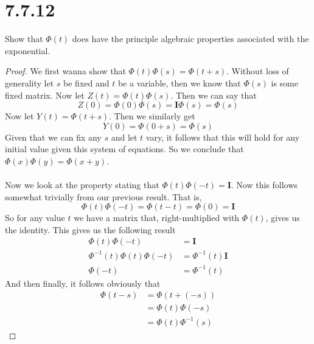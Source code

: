 \documentclass{article}
\theoremstyle{definition}
\begin{document}
\section*{7.7.12}
    \begin{mdframed}[]
        Show that $\Phi(t)$ does have the principle algebraic properties associated with the exponential.
    \end{mdframed}
    \begin{proof}
        We first wanna show that $\Phi(t)\Phi(s) = \Phi(t + s)$. Without loss of generality let $s$ be fixed and 
        $t$ be a variable, then we know that $\Phi(s)$ is some fixed matrix. Now let $Z(t) = \Phi(t)\Phi(s)$. Then 
        we can say that 
        \[
            Z(0) = \Phi(0)\Phi(s) = \bm I \Phi(s) = \Phi(s)
        \]
        Now let $Y(t) = \Phi(t + s)$. Then we similarly get
        \[
            Y(0) = \Phi(0 + s) = \Phi(s)
        \]
        Given that we can fix any $s$ and let $t$ vary, it follows that this will hold for any initial value
        given this system of equations. So we conclude that $\Phi(x)\Phi(y) = \Phi(x + y)$.\\\\
        Now we look at the property stating that $\Phi(t)\Phi(-t) = \bm I$. Now this follows somewhat trivially from 
        our previous result. That is,
        \[
            \Phi(t)\Phi(-t) = \Phi(t - t) = \Phi(0) = \bm I  
        \]
        So for any value $t$ we have a matrix that, right-multiplied with $\Phi(t)$, gives us the identity. This gives us 
        the following result 
        \begin{align*}
            \Phi(t)\Phi(-t) &= \bm I \\
            \Phi^{-1}(t)\Phi(t)\Phi(-t) &= \Phi^{-1}(t) \bm I \\
            \Phi(-t) &= \Phi^{-1}(t)
        \end{align*}
        And then finally, it follows obviously that 
        \begin{align*}
            \Phi(t - s) &= \Phi(t + (-s)) \\
            &= \Phi(t)\Phi(-s) \\
            &= \Phi(t)\Phi^{-1}(s)
        \end{align*}
    \end{proof}
\end{document}
